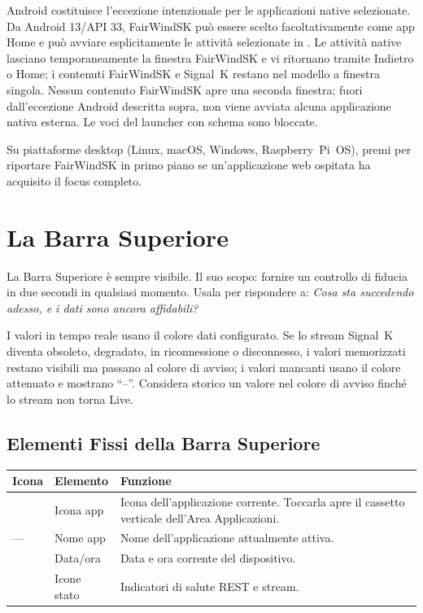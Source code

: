 Android costituisce l'eccezione intenzionale per le applicazioni native selezionate.
Da Android 13/API 33, FairWindSK può essere scelto facoltativamente come app Home e
può avviare esplicitamente le attività selezionate in .
Le attività native lasciano temporaneamente la finestra FairWindSK e vi ritornano
tramite Indietro o Home; i contenuti FairWindSK e Signal~K restano nel modello a
finestra singola.
Nessun contenuto FairWindSK apre una seconda finestra; fuori dall'eccezione Android
descritta sopra, non viene avviata alcuna applicazione nativa esterna.
Le voci del launcher con schema  sono bloccate.

Su piattaforme desktop (Linux, macOS, Windows, Raspberry~Pi~OS), premi 
per riportare FairWindSK in primo piano se un'applicazione web ospitata ha acquisito
il focus completo.

\chapter{La Barra Superiore}
\label{ch:barrasuperiore}

La Barra Superiore è sempre visibile.
Il suo scopo: fornire un controllo di fiducia in due secondi in qualsiasi momento.
Usala per rispondere a: \textit{Cosa sta succedendo adesso, e i dati sono ancora affidabili?}

I valori in tempo reale usano il colore dati configurato. Se lo stream Signal~K diventa
obsoleto, degradato, in riconnessione o disconnesso, i valori memorizzati restano visibili
ma passano al colore di avviso; i valori mancanti usano il colore attenuato e mostrano
``--''. Considera storico un valore nel colore di avviso finch\'e lo stream non torna Live.


\section{Elementi Fissi della Barra Superiore}

\begin{longtable}{C{1.5cm}L{2.8cm}L{9.4cm}}
\toprule
{}
\color{white}\sffamily\bfseries Icona &
\color{white}\sffamily\bfseries Elemento &
\color{white}\sffamily\bfseries Funzione \\
\midrule
{}       & Icona app    &
  Icona dell'applicazione corrente.
  Toccarla apre il cassetto verticale dell'Area Applicazioni. \\
---                     & Nome app     &
  Nome dell'applicazione attualmente attiva. \\
     & Data/ora     &
  Data e ora corrente del dispositivo. \\
& Icone stato  &
  Indicatori di salute REST e stream. \\
\bottomrule
\end{longtable}


